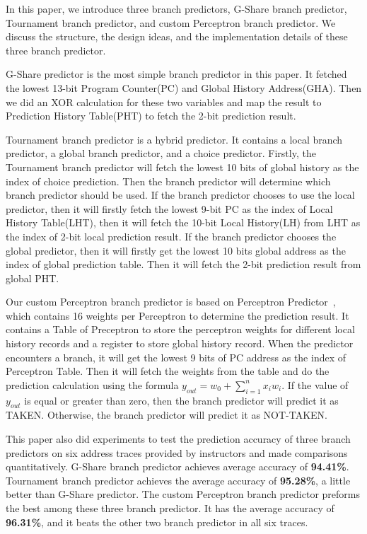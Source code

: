 \documentclass[conference]{IEEEtran}
\begin{document}
In this paper, we introduce three branch predictors, G-Share branch predictor, Tournament branch predictor, and custom Perceptron branch predictor. 
We discuss the structure, the design ideas, and the implementation details of these three branch predictor.

G-Share predictor is the most simple branch predictor in this paper. It fetched the lowest 13-bit Program Counter(PC) and Global History Address(GHA). Then we did an XOR calculation for these two variables
and map the result to Prediction History Table(PHT) to fetch the 2-bit prediction result. 

Tournament branch predictor is a hybrid predictor. It contains a local branch
predictor, a global branch predictor, and a choice predictor. Firstly, the Tournament branch predictor will fetch the lowest 10 bits of global history as the index of choice prediction. Then the branch predictor 
will determine which branch predictor should be used. If the branch predictor chooses to use the local predictor, then it will firstly fetch the lowest 9-bit PC as the index of Local History Table(LHT), then it 
will fetch the 10-bit Local History(LH) from LHT as the index of 2-bit local prediction result. If the branch predictor chooses the global predictor, then
it will firstly get the lowest 10 bits global address as the index of global prediction table. Then it will fetch the 2-bit prediction result from global PHT.

Our custom Perceptron branch predictor is based on Perceptron Predictor~\cite{nicepaper4}, which contains 16 weights per Perceptron to determine the prediction result. It contains a Table of Preceptron to store the perceptron weights for different local
history records and a register to store global history record. When the predictor encounters a branch, it will get the lowest 9 bits of PC address as the index of Perceptron Table. Then it will fetch the weights from the table and do
the prediction calculation using the formula $y_{out}=w_0+\sum_{i=1}^{n}{x_iw_i}$. If the value of $y_{out}$ is equal or greater than zero, then the branch predictor will predict it as TAKEN. Otherwise, the branch predictor will predict it as NOT-TAKEN. 

This paper also did experiments to test the prediction accuracy of three branch predictors on six address traces provided by instructors and made comparisons quantitatively. 
G-Share branch predictor achieves average accuracy of \textbf{94.41\%}. Tournament branch predictor achieves the average accuracy of \textbf{95.28\%}, a little better than G-Share predictor. 
The custom Perceptron branch predictor preforms the best among these three branch predictor. It has the average accuracy of \textbf{96.31\%}, and it beats the other two branch predictor in all six traces. 
\end{document}
